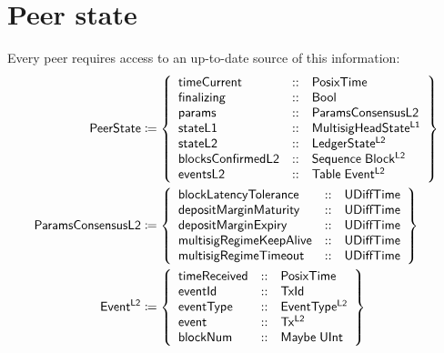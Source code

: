 \documentclass[../hydrozoa.tex]{subfiles}
\begin{document}
\section{Peer state}%
\label{h:l2-peer-state}%

Every peer requires access to an up-to-date source of this information:
\begin{equation*}
\begin{split}
  \mathsf{PeerState} &\coloneq \left\{
    \begin{array}{lll}
      \mathsf{timeCurrent} &::& \mathsf{PosixTime} \\
      \mathsf{finalizing} &::& \mathsf{Bool} \\
      \mathsf{params} &::& \mathsf{ParamsConsensusL2} \\
      \mathsf{stateL1} &::& \mathsf{MultisigHeadState^{L1}} \\
      \mathsf{stateL2} &::& \mathsf{LedgerState^{L2}} \\
      \mathsf{blocksConfirmedL2} &::& \mathsf{Sequence} \; \mathsf{Block^{L2}} \\
      \mathsf{eventsL2} &::& \mathsf{Table} \; \mathsf{Event^{L2}}
    \end{array}\right\} \\
  \mathsf{ParamsConsensusL2} &\coloneq \left\{
    \begin{array}{lll}
      \mathsf{blockLatencyTolerance} &::& \mathsf{UDiffTime} \\
      \mathsf{depositMarginMaturity} &::& \mathsf{UDiffTime} \\
      \mathsf{depositMarginExpiry} &::& \mathsf{UDiffTime} \\
      \mathsf{multisigRegimeKeepAlive} &::& \mathsf{UDiffTime} \\
      \mathsf{multisigRegimeTimeout} &::& \mathsf{UDiffTime}
    \end{array}\right\} \\
  \mathsf{Event^{L2}} &\coloneq \left\{
    \begin{array}{lll}
      \mathsf{timeReceived} &::& \mathsf{PosixTime} \\
      \mathsf{eventId} &::& \mathsf{TxId} \\
      \mathsf{eventType} &::& \mathsf{EventType^{L2}} \\
      \mathsf{event} &::& \mathsf{Tx^{L2}} \\
      \mathsf{blockNum} &::& \mathsf{Maybe} \; \mathsf{UInt}
    \end{array}\right\} \\
\end{split}
\end{equation*}
\end{document}
